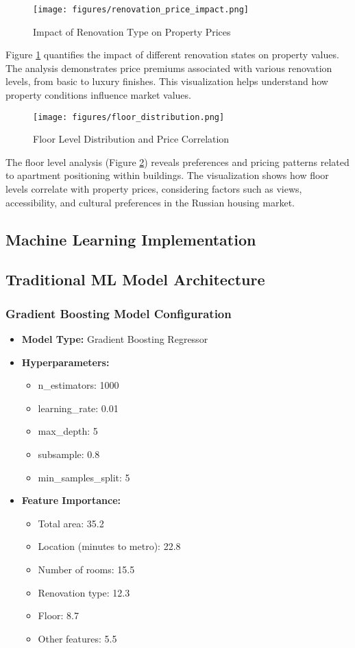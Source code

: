 \documentclass[12pt,a4paper]{report}
\begin{document}
\begin{figure}[H]
\centering
\texttt{[image: figures/renovation\_price\_impact.png]}
\caption{Impact of Renovation Type on Property Prices}
\label{fig:renovation_impact}
\end{figure}
Figure \ref{fig:renovation_impact} quantifies the impact of different renovation states on property values. The analysis demonstrates price premiums associated with various renovation levels, from basic to luxury finishes. This visualization helps understand how property conditions influence market values.
\begin{figure}[H]
\centering
\texttt{[image: figures/floor\_distribution.png]}
\caption{Floor Level Distribution and Price Correlation}
\label{fig:floor_dist}
\end{figure}
The floor level analysis (Figure \ref{fig:floor_dist}) reveals preferences and pricing patterns related to apartment positioning within buildings. The visualization shows how floor levels correlate with property prices, considering factors such as views, accessibility, and cultural preferences in the Russian housing market.
\subsection{Machine Learning Implementation}
\subsection{Traditional ML Model Architecture}
\subsubsection{Gradient Boosting Model Configuration}
\begin{itemize}
    \item \textbf{Model Type:} Gradient Boosting Regressor
    \item \textbf{Hyperparameters:}
    \begin{itemize}
        \item n_estimators: 1000
        \item learning_rate: 0.01
        \item max_depth: 5
        \item subsample: 0.8
        \item min_samples_split: 5
    \end{itemize}
    \item \textbf{Feature Importance:}
    \begin{itemize}
        \item Total area: 35.2%
        \item Location (minutes to metro): 22.8%
        \item Number of rooms: 15.5%
        \item Renovation type: 12.3%
        \item Floor: 8.7%
        \item Other features: 5.5%
    \end{itemize}
\end{itemize}
\end{document}
